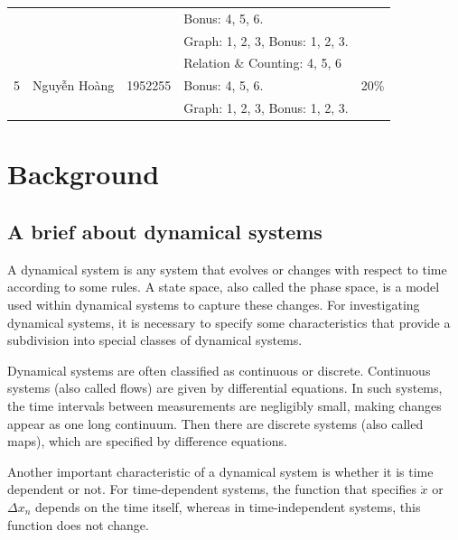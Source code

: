\documentclass[a4paper]{article}
\begin{document}
\begin{center}
\begin{tabular}{|c|c|c|l|c|}
                       &                                        &                          & Bonus: 4, 5, 6.                               &                             \\
                       &                                        &                          & \textendash{} Graph: 1, 2, 3, Bonus: 1, 2, 3. &                             \\
    \hline
    \multirow{3}{*}{5} & \multirow{3}{*}{Nguyễn Hoàng}          & \multirow{3}{*}{1952255} & \textendash{} Relation \& Counting: 4, 5, 6   & \multirow{3}{*}{20\%}       \\
                       &                                        &                          & Bonus: 4, 5, 6.                               &                             \\
                       &                                        &                          & \textendash{} Graph: 1, 2, 3, Bonus: 1, 2, 3. &                             \\
    \hline
  \end{tabular}
\end{center}


\newpage
\section{Background}
\subsection{A brief about dynamical systems}
A dynamical system is any system that evolves or changes with respect to time according to some rules.
A state space, also called the phase space, is a model used within dynamical systems to capture these changes.
For investigating dynamical systems, it is necessary to specify some characteristics that provide a subdivision into special classes of dynamical systems.

Dynamical systems are often classified as continuous or discrete.
Continuous systems (also called flows) are given by differential equations.
In such systems, the time intervals between measurements are negligibly small, making changes appear as one long continuum.
Then there are discrete systems (also called maps), which are specified by difference equations.

Another important characteristic of a dynamical system is whether it is time dependent or not.
For time-dependent systems, the function that specifies \(\dot{x}\) or \(\Delta{x_n}\) depends on the time itself, whereas in time-independent systems, this function does not change.
\end{document}
